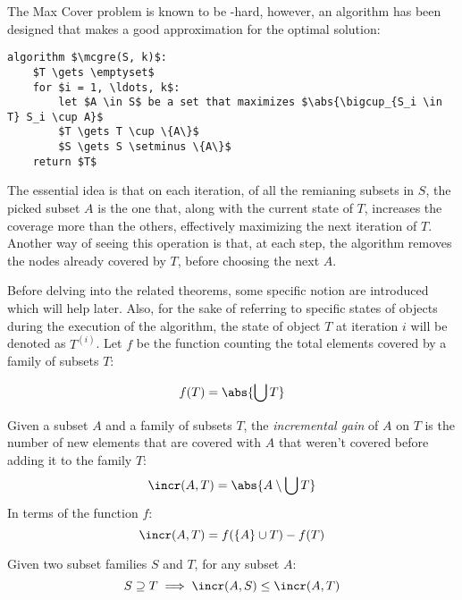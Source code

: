 The Max Cover problem is known to be \np-hard, however, an algorithm has been designed that makes a good approximation for the optimal solution:

\noindent\begin{minipage}{\linewidth}
    \begin{lstlisting}[caption = {The Greedy algorithm to solve the densest subgraph problem}, label = {lst:mcp-greedy}]
algorithm $\mcgre(S, k)$:
    $T \gets \emptyset$
    for $i = 1, \ldots, k$:
        let $A \in S$ be a set that maximizes $\abs{\bigcup_{S_i \in T} S_i \cup A}$
        $T \gets T \cup \{A\}$
        $S \gets S \setminus \{A\}$
    return $T$
    \end{lstlisting}
\end{minipage}

The essential idea is that on each iteration, of all the remianing subsets in $S$, the picked subset $A$ is the one that, along with the current state of $T$, increases the coverage more than the others, effectively maximizing the next iteration of $T$. Another way of seeing this operation is that, at each step, the algorithm removes the nodes already covered by $T$, before choosing the next $A$.

Before delving into the related theorems, some specific notion are introduced which will help later. Also, for the sake of referring to specific states of objects during the execution of the algorithm, the state of object $T$ at iteration $i$ will be denoted as $T^{(i)}$. Let $f$ be the function counting the total elements covered by a family of subsets $T$:

\[
    f(T) = \abs{\bigcup T}
\]

\begin{definition}\label{def:incremental-gain}
    Given a subset $A$ and a family of subsets $T$, the \emph{incremental gain} of $A$ on $T$ is the number of new elements that are covered with $A$ that weren't covered before adding it to the family $T$:
    \[
        \incr(A, T) = \abs{A \setminus \bigcup T}
    \]
    In terms of the function $f$:
    \begin{equation}\label{eq:mcp-dsa}
        \incr(A, T) = f(\{A\} \cup T) - f(T)
    \end{equation}
\end{definition}

\begin{proposition}\label{prop:mcp-dimret}
    Given two subset families $S$ and $T$, for any subset $A$:
    \[
        S \supseteq T \implies \incr(A, S) \leq \incr(A, T)
    \]
\end{proposition}

